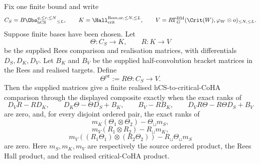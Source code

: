 \begin{proposition}
\label{prop:finite-realized-hcs-hall-composite-gate}
Fix one finite bound and write
\[
 C_S=B\Obs_{\mathrm{hCS}}^{q,\le r,\le N}{}_{\le L},\qquad
 K=\Hall_{\mathrm{crit}}^{\mathrm{Rees},\mathrm{or},\le N,\le L},
 \qquad
 V=R\Gamma^{\mathrm{BM}}_G(\Crit(W),\varphi_W\otimes o)_{\le N,\le L}.
\]
Suppose finite bases have been chosen. Let
\[
 \Theta\colon C_S\to K,\qquad R\colon K\to V
\]
be the supplied Rees comparison and realisation matrices, with
differentials \(D_S,D_K,D_V\). Let \(B_K\) and \(B_V\) be the supplied
half-convolution bracket matrices in the Rees and realised targets.
Define
\[
 \Theta^{\mathrm{or}}:=R\Theta\colon C_S\to V .
\]
Then the supplied matrices give a finite realised hCS-to-critical-CoHA
comparison through the displayed composite exactly when the exact ranks
of
\[
 D_VR-RD_K,\qquad
 D_K\Theta-\Theta D_S+B_K,\qquad
 B_V-RB_K,\qquad
 D_VR\Theta-R\Theta D_S+B_V
\]
are zero, and, for every disjoint ordered pair, the exact ranks of
\[
 m_K(\Theta_1\otimes\Theta_2)-\Theta_\sqcup m_S,
\]
\[
 m_V(R_1\otimes R_2)-R_\sqcup m_K,
\]
\[
 m_V((R_1\Theta_1)\otimes(R_2\Theta_2))
 -R_\sqcup\Theta_\sqcup m_S
\]
are zero. Here \(m_S,m_K,m_V\) are respectively the source ordered
product, the Rees Hall product, and the realised critical-CoHA product.
\end{proposition}

